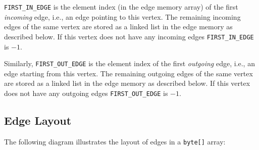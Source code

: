 \documentclass[a4paper]{article}
\begin{document}
\texttt{FIRST\_IN\_EDGE} is the element index (in the edge memory array) of the first \emph{incoming} edge, i.e., an edge pointing to this vertex. The remaining incoming edges of the same vertex are stored as a linked list in the edge memory as described below.
If this vertex does not have any incoming edges \texttt{FIRST\_IN\_EDGE} is $-1$.

Similarly, \texttt{FIRST\_OUT\_EDGE} is the element index of the first \emph{outgoing} edge, i.e., an edge starting from this vertex. The remaining outgoing edges of the same vertex are stored as a linked list in the edge memory as described below.
If this vertex does not have any outgoing edges \texttt{FIRST\_OUT\_EDGE} is $-1$.

\subsection{Edge Layout}
The following diagram illustrates the layout of edges in a \texttt{byte[]} array:
\end{document}
